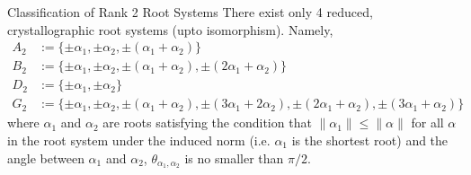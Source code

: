 \begin{namedtheorem}{Classification of Rank 2 Root Systems}
    There exist only 4 reduced, crystallographic root systems (upto isomorphism). Namely,
    \begin{equation*}
    \begin{aligned}
        A_2 &:= \{\pm \alpha_1, \pm \alpha_2, \pm (\alpha_1 + \alpha_2) \} \\
        B_2 &:= \{\pm \alpha_1, \pm \alpha_2, \pm (\alpha_1 + \alpha_2), \pm (2 \alpha_1 + \alpha_2) \} \\
        D_2 &:= \{\pm \alpha_1, \pm \alpha_2 \} \\
        G_2 &:= \{\pm \alpha_1, \pm \alpha_2, \pm (\alpha_1 + \alpha_2), \pm (3\alpha_1 + 2\alpha_2), \pm (2\alpha_1 + \alpha_2), \pm (3\alpha_1 + \alpha_2) \}
    \end{aligned}
    \end{equation*}
    where $\alpha_1$ and $\alpha_2$ are roots satisfying the condition that $\|\alpha_1\| \leq \|\alpha\|$ for all $\alpha$ in the root system
    under the induced norm (i.e. $\alpha_1$ is the shortest root) and the angle between $\alpha_1$ and $\alpha_2$,
    $\theta_{\alpha_1, \alpha_2}$ is no smaller than $\pi / 2$.
\end{namedtheorem}

